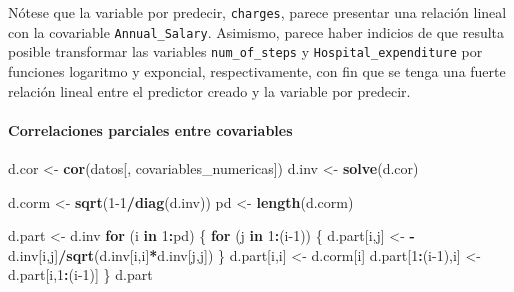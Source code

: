 \documentclass[
]{article}
\newenvironment{Shaded}{\begin{snugshade}}{\end{snugshade}}
\newcommand{\ControlFlowTok}[1]{\textcolor[rgb]{0.13,0.29,0.53}{\textbf{#1}}}
\newcommand{\DecValTok}[1]{\textcolor[rgb]{0.00,0.00,0.81}{#1}}
\newcommand{\FunctionTok}[1]{\textcolor[rgb]{0.13,0.29,0.53}{\textbf{#1}}}
\newcommand{\NormalTok}[1]{#1}
\newcommand{\OtherTok}[1]{\textcolor[rgb]{0.56,0.35,0.01}{#1}}
\newcommand{\SpecialCharTok}[1]{\textcolor[rgb]{0.81,0.36,0.00}{\textbf{#1}}}
\begin{document}
Nótese que la variable por predecir, \texttt{charges}, parece presentar
una relación lineal con la covariable \texttt{Annual\_Salary}. Asimismo,
parece haber indicios de que resulta posible transformar las variables
\texttt{num\_of\_steps} y \texttt{Hospital\_expenditure} por funciones
logaritmo y exponcial, respectivamente, con fin que se tenga una fuerte
relación lineal entre el predictor creado y la variable por predecir.

\paragraph{Correlaciones parciales entre
covariables}\label{correlaciones-parciales-entre-covariables}

\begin{Shaded}
\begin{Highlighting}[]
\NormalTok{d.cor }\OtherTok{\textless{}{-}} \FunctionTok{cor}\NormalTok{(datos[, covariables\_numericas])}
\NormalTok{d.inv }\OtherTok{\textless{}{-}} \FunctionTok{solve}\NormalTok{(d.cor)}

\NormalTok{d.corm }\OtherTok{\textless{}{-}} \FunctionTok{sqrt}\NormalTok{(}\DecValTok{1{-}1}\SpecialCharTok{/}\FunctionTok{diag}\NormalTok{(d.inv))}
\NormalTok{pd }\OtherTok{\textless{}{-}} \FunctionTok{length}\NormalTok{(d.corm)  }


\NormalTok{d.part }\OtherTok{\textless{}{-}}\NormalTok{ d.inv}
\ControlFlowTok{for}\NormalTok{ (i }\ControlFlowTok{in} \DecValTok{1}\SpecialCharTok{:}\NormalTok{pd) \{}
  \ControlFlowTok{for}\NormalTok{ (j }\ControlFlowTok{in} \DecValTok{1}\SpecialCharTok{:}\NormalTok{(i}\DecValTok{{-}1}\NormalTok{)) \{}
\NormalTok{    d.part[i,j] }\OtherTok{\textless{}{-}} \SpecialCharTok{{-}}\NormalTok{d.inv[i,j]}\SpecialCharTok{/}\FunctionTok{sqrt}\NormalTok{(d.inv[i,i]}\SpecialCharTok{*}\NormalTok{d.inv[j,j])}
\NormalTok{  \}}
\NormalTok{  d.part[i,i] }\OtherTok{\textless{}{-}}\NormalTok{ d.corm[i]}
\NormalTok{  d.part[}\DecValTok{1}\SpecialCharTok{:}\NormalTok{(i}\DecValTok{{-}1}\NormalTok{),i] }\OtherTok{\textless{}{-}}\NormalTok{ d.part[i,}\DecValTok{1}\SpecialCharTok{:}\NormalTok{(i}\DecValTok{{-}1}\NormalTok{)]  }
\NormalTok{\}}
\NormalTok{d.part}
\end{Highlighting}
\end{Shaded}
\end{document}
